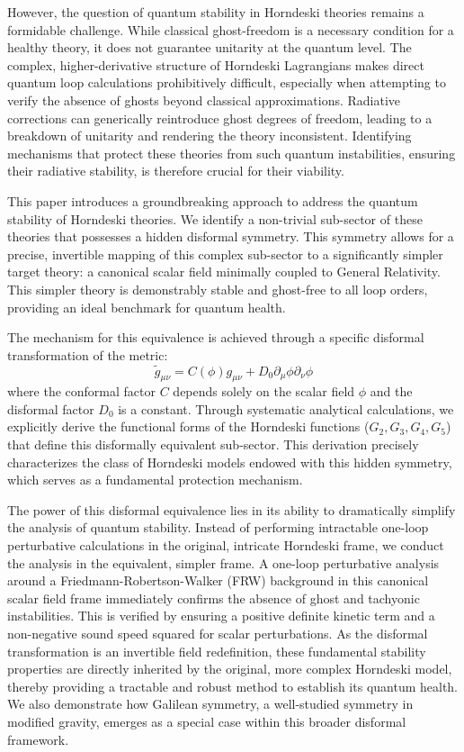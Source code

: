 \documentclass[twocolumn]{aastex631}
\begin{document}
However, the question of quantum stability in Horndeski theories remains a formidable challenge. While classical ghost-freedom is a necessary condition for a healthy theory, it does not guarantee unitarity at the quantum level. The complex, higher-derivative structure of Horndeski Lagrangians makes direct quantum loop calculations prohibitively difficult, especially when attempting to verify the absence of ghosts beyond classical approximations. Radiative corrections can generically reintroduce ghost degrees of freedom, leading to a breakdown of unitarity and rendering the theory inconsistent. Identifying mechanisms that protect these theories from such quantum instabilities, ensuring their radiative stability, is therefore crucial for their viability.

This paper introduces a groundbreaking approach to address the quantum stability of Horndeski theories. We identify a non-trivial sub-sector of these theories that possesses a hidden disformal symmetry. This symmetry allows for a precise, invertible mapping of this complex sub-sector to a significantly simpler target theory: a canonical scalar field minimally coupled to General Relativity. This simpler theory is demonstrably stable and ghost-free to all loop orders, providing an ideal benchmark for quantum health.

The mechanism for this equivalence is achieved through a specific disformal transformation of the metric:
\begin{equation*}
\tilde{g}_{\mu\nu} = C(\phi) g_{\mu\nu} + D_0 \partial_\mu\phi \partial_\nu\phi
\end{equation*}
where the conformal factor $C$ depends solely on the scalar field $\phi$ and the disformal factor $D_0$ is a constant. Through systematic analytical calculations, we explicitly derive the functional forms of the Horndeski functions ($G_2, G_3, G_4, G_5$) that define this disformally equivalent sub-sector. This derivation precisely characterizes the class of Horndeski models endowed with this hidden symmetry, which serves as a fundamental protection mechanism.

The power of this disformal equivalence lies in its ability to dramatically simplify the analysis of quantum stability. Instead of performing intractable one-loop perturbative calculations in the original, intricate Horndeski frame, we conduct the analysis in the equivalent, simpler frame. A one-loop perturbative analysis around a Friedmann-Robertson-Walker (FRW) background in this canonical scalar field frame immediately confirms the absence of ghost and tachyonic instabilities. This is verified by ensuring a positive definite kinetic term and a non-negative sound speed squared for scalar perturbations. As the disformal transformation is an invertible field redefinition, these fundamental stability properties are directly inherited by the original, more complex Horndeski model, thereby providing a tractable and robust method to establish its quantum health. We also demonstrate how Galilean symmetry, a well-studied symmetry in modified gravity, emerges as a special case within this broader disformal framework.
\end{document}
